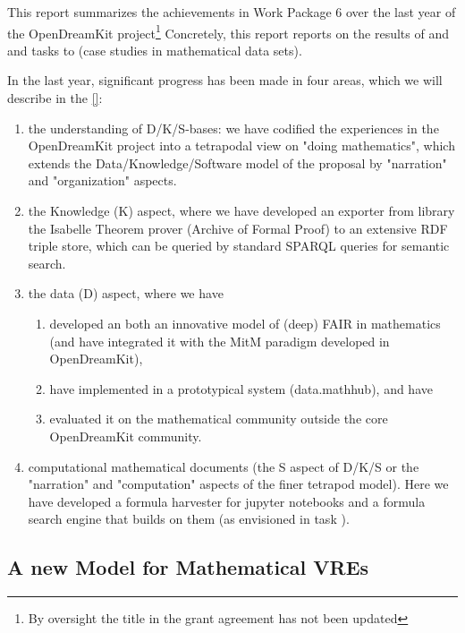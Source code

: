 This report summarizes the achievements in Work Package 6 over the last year of the OpenDreamKit project\footnote{By oversight the title in the grant agreement has not been updated} Concretely, this report reports on the results of  and  and tasks  to  (case studies in mathematical data sets).

In the last year, significant progress has been made in four areas, which we will describe in the \ref{}:
\begin{enumerate}
\item the understanding of D/K/S-bases: we have codified the experiences in the OpenDreamKit project into a tetrapodal view on "doing mathematics", which extends the Data/Knowledge/Software model of the proposal by "narration" and "organization" aspects. \item the Knowledge (K) aspect, where we have developed an exporter from library the Isabelle Theorem prover (Archive of Formal Proof) to an extensive RDF triple store, which can be queried by standard SPARQL queries for semantic search. \item the data (D) aspect, where we have
  \begin{enumerate}
  \item developed an both an innovative model of (deep) FAIR in mathematics (and have integrated it with the MitM paradigm developed in OpenDreamKit),
  \item have implemented in a prototypical system (data.mathhub), and have
  \item evaluated it on the mathematical community outside the core OpenDreamKit community.
  \end{enumerate}
\item computational mathematical documents (the S aspect of D/K/S or the "narration" and "computation" aspects of the finer tetrapod model). Here we have developed a formula harvester for jupyter notebooks and a formula search engine that builds on them (as envisioned in task ).
\end{enumerate}
 
\subsection{A new Model for Mathematical VREs}\label{sec:tetrapod}

